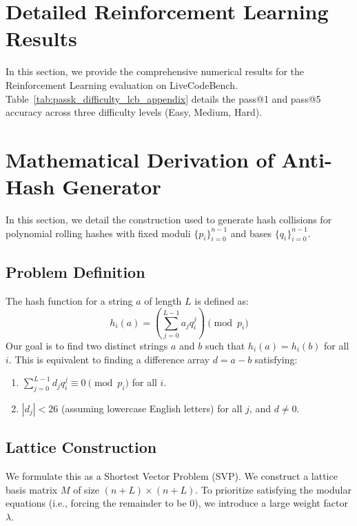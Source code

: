 \documentclass[11pt]{article}
\begin{document}
\section{Detailed Reinforcement Learning Results}
\label{appx:detailed_rl_results}

In this section, we provide the comprehensive numerical results for the Reinforcement Learning evaluation on LiveCodeBench. Table~\ref{tab:passk_difficulty_lcb_appendix} details the pass@1 and pass@5 accuracy across three difficulty levels (Easy, Medium, Hard).



\section{Mathematical Derivation of Anti-Hash Generator}
\label{appx:antihash}

In this section, we detail the construction used to generate hash collisions for polynomial rolling hashes with fixed moduli $\{p_i\}_{i=0}^{n-1}$ and bases $\{q_i\}_{i=0}^{n-1}$.



\subsection{Problem Definition}
The hash function for a string $a$ of length $L$ is defined as:
\[
h_i(a) = \left( \sum_{j=0}^{L-1} a_j q_i^j \right) \pmod{p_i}
\]
Our goal is to find two distinct strings $a$ and $b$ such that $h_i(a) = h_i(b)$ for all $i$. This is equivalent to finding a difference array $d = a - b$ satisfying:
\begin{enumerate}
    \item $\sum_{j=0}^{L-1} d_j q_i^j \equiv 0 \pmod{p_i}$ for all $i$.
    \item $|d_j| < 26$ (assuming lowercase English letters) for all $j$, and $d \neq 0$.
\end{enumerate}

\subsection{Lattice Construction}
We formulate this as a Shortest Vector Problem (SVP). We construct a lattice basis matrix $M$ of size $(n + L) \times (n + L)$. To prioritize satisfying the modular equations (i.e., forcing the remainder to be 0), we introduce a large weight factor $\lambda$.
\end{document}
